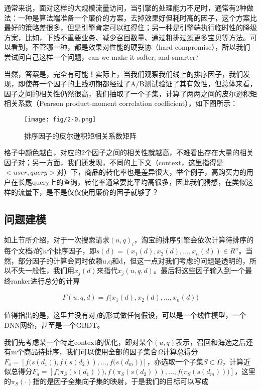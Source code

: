 通常来说，面对这样的大规模流量访问，当引擎的处理能力不足时，通常有2种做法：一种是算法端准备一个廉价的方案，去掉效果好但耗时高的因子，这个方案比最好的策略差很多，但是引擎肯定可以扛得住；另一种是引擎端执行临时性的降级方案，比如，下线不重要业务、减少召回数量、通过粗排过滤更多宝贝等方法。可以看到，不管哪一种，都是效果对性能的硬妥协（hard compromise），所以我们尝试问自己这样一个问题，can we make it softer, and smarter?

当然，答案是，完全有可能！实际上，当我们观察我们线上的排序因子，我们发现，即使每一个因子的上线初期都经过了A/B测试验证了其有效性，但总体来看，因子之间的相关性仍然很高，我们抽取了一个子集，计算了两两之间的皮尔逊积矩相关系数（Pearson product-moment correlation coefficient），如下图所示：

\begin{figure}[!h]
\centering
\texttt{[image: fig/2-0.png]}
\caption{排序因子的皮尔逊积矩相关系数矩阵}
\end{figure}

格子中颜色越白，对应的2个因子之间的相关性就越高，不难看出存在大量的相关因子对；另一方面，我们还发现，不同的上下文（context，这里指得是$<user,query>$对）下，商品的转化率也是差异很大，举个例子，高购买力的用户在长尾query上的查询，转化率通常要比平均高很多，因此我们猜想，在类似这样的流量下，是不是仅仅使用廉价的因子就够了？

\subsection{问题建模}
如上节所介绍，对于一次搜索请求$(u,q)_i$，淘宝的排序引擎会依次计算待排序的每个文档$d$的$n$个排序因子，即$s(d)=(x_{1}(d),x_{2}(d),...,x_{n}(d)) \in R^n$。当然，部分因子的计算会同时依赖u,q和d，但这一点对我们考虑的问题是透明的，所以不失一般性，我们用$x_{j}(d)$来指代$x_{j}(u,q,d)$。最后将这些因子输入到一个最终ranker进行总分的计算

\begin{align}
F(u,q,d)=f\big(x_{1}(d),x_{2}(d),...,x_{n}(d)\big)
\end{align}

值得指出的是，这里并没有对$f$的形式做任何假设，可以是一个线性模型，一个DNN网络，甚至是一个GBDT。

我们先考虑某一个特定context的优化，即对某个$(u,q)$表示，召回和海选之后还有m个商品待排序，我们可以使用全部的因子集合$\Omega$计算总得分$F_o=[f\big(s(d_1)),f(s(d_2)),...,f(s(d_m)\big)]$，亦选取一个子集$S \subset \Omega$，计算近似总得分$F_a=[f\big(\pi_S(s(d_1))),f(\pi_S(s(d_2))),...,f(\pi_S(s(d_m))\big)]$，这里的$\pi_S(\cdot)$指的是因子全集向子集的映射，于是我们的目标可以写成

